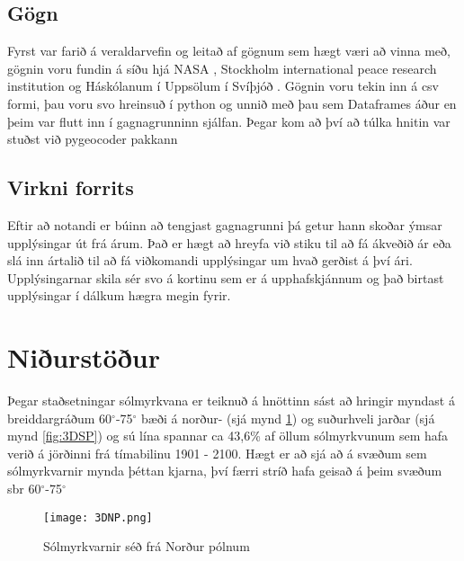 \documentclass[12pt, git, final]{rureport}
\begin{document}

\subsection{Gögn}
Fyrst var farið á veraldarvefin og leitað af gögnum sem hægt væri að vinna með, gögnin voru fundin á síðu hjá NASA \cite{Eclipse}, Stockholm international peace research institution \cite{weapon} og Háskólanum í Uppsölum í Svíþjóð \cite{conflict}. Gögnin voru tekin inn á csv formi, þau voru svo hreinsuð í python og unnið með þau sem Dataframes áður en þeim var flutt inn í gagnagrunninn sjálfan. Þegar kom að því að túlka hnitin var stuðst við pygeocoder pakkann \cite{geocoder}





\subsection{Virkni forrits}\label{virkni}
Eftir að notandi er búinn að tengjast gagnagrunni þá getur hann skoðar ýmsar upplýsingar út frá árum. Það er hægt að hreyfa við stiku til að fá ákveðið ár eða slá inn ártalið til að fá viðkomandi upplýsingar um hvað gerðist á því ári. Upplýsingarnar skila sér svo á kortinu sem er á upphafskjánnum og það birtast upplýsingar í dálkum hægra megin fyrir. 


\section{Niðurstöður}\label{nidurstodur}

Þegar staðsetningar sólmyrkvana er teiknuð á hnöttinn sást að hringir myndast á breiddargráðum 60$^{\circ}$-75$^{\circ}$ bæði á norður- (sjá mynd \ref{fig:3DNP}) og suðurhveli jarðar (sjá mynd \ref{fig:3DSP}) og sú lína spannar ca 43,6\% af öllum sólmyrkvunum sem hafa verið á jörðinni frá tímabilinu 1901 - 2100. Hægt er að sjá að á svæðum sem sólmyrkvarnir mynda þéttan kjarna, því færri stríð hafa geisað á þeim svæðum sbr 60$^{\circ}$-75$^{\circ}$
\pagebreak

\begin{figure}
	\centering
	\texttt{[image: 3DNP.png]}
	\caption{Sólmyrkvarnir séð frá Norður pólnum}
	\label{fig:3DNP}
\end{figure}
\end{document}
